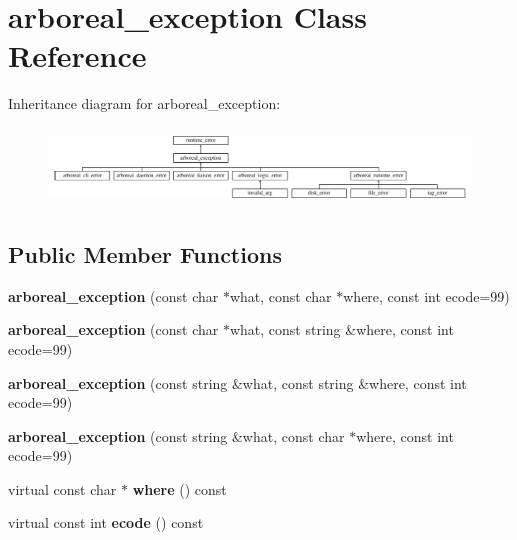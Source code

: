 \hypertarget{classarboreal__exception}{}\section{arboreal\+\_\+exception Class Reference}
\label{classarboreal__exception}
Inheritance diagram for arboreal\+\_\+exception\+:\begin{figure}[H]
\begin{center}
\leavevmode
\includegraphics[height=2.064516cm]{classarboreal__exception}
\end{center}
\end{figure}
\subsection*{Public Member Functions}
\begin{DoxyCompactItemize}
\item 
{\bfseries arboreal\+\_\+exception} (const char $\ast$what, const char $\ast$where, const int ecode=99)\hypertarget{classarboreal__exception_a11dbf1da86d3d2b3cfee2f3aeb80117b}{}\label{classarboreal__exception_a11dbf1da86d3d2b3cfee2f3aeb80117b}

\item 
{\bfseries arboreal\+\_\+exception} (const char $\ast$what, const string \&where, const int ecode=99)\hypertarget{classarboreal__exception_aa5a71af74c46ffa83716fcdfdb6890e5}{}\label{classarboreal__exception_aa5a71af74c46ffa83716fcdfdb6890e5}

\item 
{\bfseries arboreal\+\_\+exception} (const string \&what, const string \&where, const int ecode=99)\hypertarget{classarboreal__exception_aa5b64424f94fda27c5a4f48a36a3cb8d}{}\label{classarboreal__exception_aa5b64424f94fda27c5a4f48a36a3cb8d}

\item 
{\bfseries arboreal\+\_\+exception} (const string \&what, const char $\ast$where, const int ecode=99)\hypertarget{classarboreal__exception_a0a289978d3da4e38cae543c936ddc176}{}\label{classarboreal__exception_a0a289978d3da4e38cae543c936ddc176}

\item 
virtual const char $\ast$ {\bfseries where} () const \hypertarget{classarboreal__exception_a099cd3faaada95ba710ae593cc3d389d}{}\label{classarboreal__exception_a099cd3faaada95ba710ae593cc3d389d}

\item 
virtual const int {\bfseries ecode} () const \hypertarget{classarboreal__exception_aa7db1e3723b077b31f621e645fc7b570}{}\label{classarboreal__exception_aa7db1e3723b077b31f621e645fc7b570}

\end{DoxyCompactItemize}
